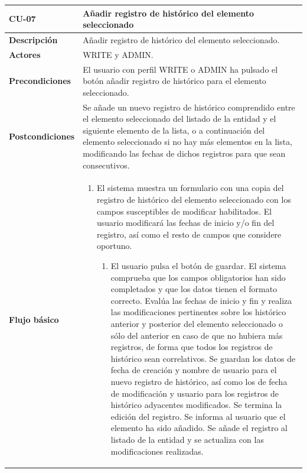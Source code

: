 \begin{table} [H]
    \centering
    \setlength{\leftmargini}{0.4cm}
	\resizebox{14cm}{!} { %
    \begin{tabular}{| m{3cm} | m{11cm} |}   
    \hline
	  \textbf{CU-07} & \textbf{Añadir registro de histórico del elemento seleccionado} \\\hline
	  \textbf{Descripción} & Añadir registro de histórico del elemento seleccionado. \\\hline
	  \textbf{Actores} & WRITE y ADMIN. \\\hline
	  \textbf{Precondiciones} & El usuario con perfil WRITE o ADMIN ha pulsado el botón añadir registro de histórico para el elemento seleccionado. \\\hline
	  \textbf{Postcondiciones} & Se añade un nuevo registro de histórico  comprendido entre el elemento seleccionado del listado de la entidad y el siguiente elemento de la lista, o a continuación del elemento seleccionado si no hay más elementos en la lista, modificando las fechas de dichos registros para que sean consecutivos. \\\hline
	  \textbf{Flujo básico} & 
		\begin{enumerate}
	  	\item El sistema muestra un formulario con una copia del registro de histórico del elemento seleccionado con los campos susceptibles de modificar habilitados. El usuario modificará las fechas de inicio y/o fin del registro, así como el resto de campos que considere oportuno. 
			\begin{enumerate}	
			   \item El usuario pulsa el botón de guardar. El sistema comprueba que los campos obligatorios han sido completados y que los datos tienen el formato correcto. Evalúa las fechas de inicio y fin y realiza las modificaciones pertinentes sobre los histórico anterior y posterior del elemento seleccionado o sólo del anterior en caso de que no hubiera más registros, de forma que todos los registros de histórico sean correlativos. Se guardan los datos de fecha de creación y nombre de usuario para el nuevo registro de histórico, así como los de fecha de modificación y usuario para los registros de histórico adyacentes modificados. Se termina la edición del registro. Se informa al usuario que el elemento ha sido añadido. Se añade el registro al listado de la entidad y se actualiza con las modificaciones realizadas.

\end{enumerate}
\end{enumerate}
\end{tabular}}
\end{table}

